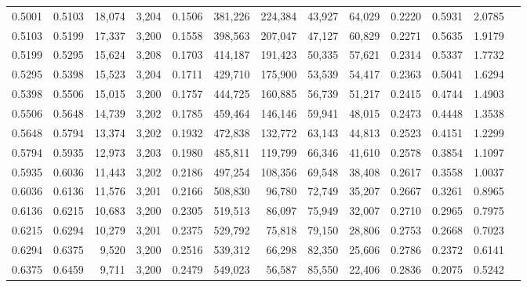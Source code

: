 \begin{tabular}{rrrrrrrrrrrrr}
0.5001 & 0.5103 & 18,074 & 3,204 &                                     0.1506 & 381,226 & 224,384 &  43,927 &  64,029 & 0.2220 & 0.5931 & 2.0785 \\
0.5103 & 0.5199 & 17,337 & 3,200 &                                     0.1558 & 398,563 & 207,047 &  47,127 &  60,829 & 0.2271 & 0.5635 & 1.9179 \\
0.5199 & 0.5295 & 15,624 & 3,208 &                                     0.1703 & 414,187 & 191,423 &  50,335 &  57,621 & 0.2314 & 0.5337 & 1.7732 \\
0.5295 & 0.5398 & 15,523 & 3,204 &                                     0.1711 & 429,710 & 175,900 &  53,539 &  54,417 & 0.2363 & 0.5041 & 1.6294 \\
0.5398 & 0.5506 & 15,015 & 3,200 &                                     0.1757 & 444,725 & 160,885 &  56,739 &  51,217 & 0.2415 & 0.4744 & 1.4903 \\
0.5506 & 0.5648 & 14,739 & 3,202 &                                     0.1785 & 459,464 & 146,146 &  59,941 &  48,015 & 0.2473 & 0.4448 & 1.3538 \\
0.5648 & 0.5794 & 13,374 & 3,202 &                                     0.1932 & 472,838 & 132,772 &  63,143 &  44,813 & 0.2523 & 0.4151 & 1.2299 \\
0.5794 & 0.5935 & 12,973 & 3,203 &                                     0.1980 & 485,811 & 119,799 &  66,346 &  41,610 & 0.2578 & 0.3854 & 1.1097 \\
0.5935 & 0.6036 & 11,443 & 3,202 &                                     0.2186 & 497,254 & 108,356 &  69,548 &  38,408 & 0.2617 & 0.3558 & 1.0037 \\
0.6036 & 0.6136 & 11,576 & 3,201 &                                     0.2166 & 508,830 &  96,780 &  72,749 &  35,207 & 0.2667 & 0.3261 & 0.8965 \\
0.6136 & 0.6215 & 10,683 & 3,200 &                                     0.2305 & 519,513 &  86,097 &  75,949 &  32,007 & 0.2710 & 0.2965 & 0.7975 \\
0.6215 & 0.6294 & 10,279 & 3,201 &                                     0.2375 & 529,792 &  75,818 &  79,150 &  28,806 & 0.2753 & 0.2668 & 0.7023 \\
0.6294 & 0.6375 &  9,520 & 3,200 &                                     0.2516 & 539,312 &  66,298 &  82,350 &  25,606 & 0.2786 & 0.2372 & 0.6141 \\
0.6375 & 0.6459 &  9,711 & 3,200 &                                     0.2479 & 549,023 &  56,587 &  85,550 &  22,406 & 0.2836 & 0.2075 & 0.5242 \\

\end{tabular}
